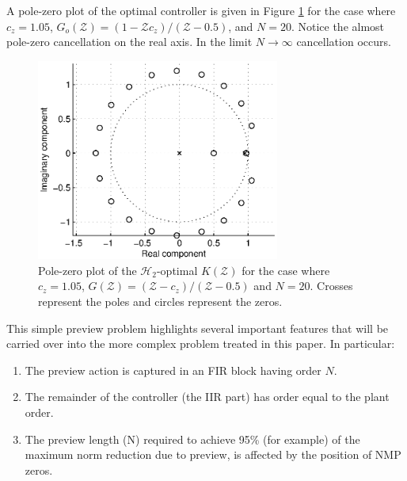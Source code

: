 \documentclass[a4paper,12pt]{article}
\theoremstyle{remark}
\newcommand{\htwo}{\mathcal H_2}
\newcommand{\z}{\cal{Z}}
\renewcommand{\z}{\mathcal{Z}}
\begin{document}
A pole-zero plot of the optimal controller is given in Figure \ref{fig:PZforSISOPrevH2} for the case where $c_z=1.05$, $G_o(\z)=(1-\z c_z)/(\z-0.5)$, and $N=20$. Notice the almost pole-zero cancellation on the real axis. In the limit $N\rightarrow \infty$ cancellation occurs. 
\begin{figure}
\begin{center}
\includegraphics[width=8cm]{./Fig_3.eps}
\end{center}
\caption{Pole-zero plot of the $\htwo$-optimal $K(\z)$ for the case where $c_z=1.05$, $G(\z)=(\z -c_z)/(\z-0.5)$ and $N=20$. Crosses represent the poles and circles represent the zeros.}
\label{fig:PZforSISOPrevH2}
\end{figure}
This simple preview problem highlights several important features that will be carried over into the more complex problem treated in this paper. In particular:
\begin{enumerate}
\item The preview action is captured in an {FIR} block having order $N$.
\item The remainder of the controller (the {IIR} part) has order equal to the plant order.
\item The preview length (N) required to achieve 95\% (for example) of the maximum norm reduction due to preview, is affected by the position of {NMP} zeros. 
\end{enumerate} 
\end{document}
